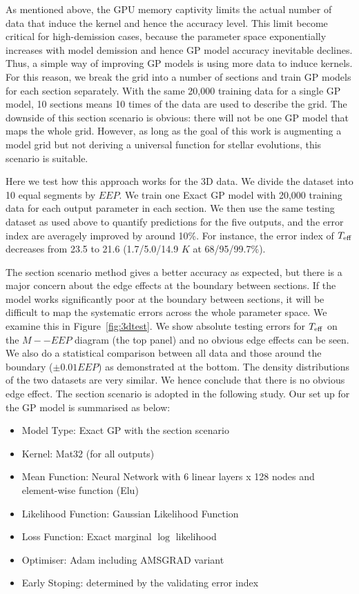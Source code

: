 As mentioned above, the GPU memory captivity limits the actual number of data that induce the kernel and hence the accuracy level.  
This limit become critical for high-demission cases, because the parameter space exponentially increases with model demission and hence GP model accuracy inevitable declines. Thus, a simple way of improving GP models is using more data to induce kernels. 
%
For this reason, we break the grid into a number of sections and train GP models for each section separately. With the same 20,000 training data for a single GP model, 10 sections means 10 times of the data are used to describe the grid. 
%
The downside of this section scenario is obvious: there will not be one GP model that maps the whole grid. However, as long as the goal of this work is augmenting a model grid but not deriving a universal function for stellar evolutions, this scenario is suitable. 

Here we test how this approach works for the 3D data. We divide the dataset into 10 equal segments by $EEP$. We train one Exact GP model with 20,000 training data for each output parameter in each section. We then use the same testing dataset as used above to quantify predictions for the five outputs, and the error index are averagely improved by around 10\%. For instance, the error index of $T_{\rm eff}$ decreases from 23.5 to 21.6 (1.7/5.0/14.9 $K$ at 68/95/99.7\%). 
%

The section scenario method gives a better accuracy as expected, but there is a major concern about the edge effects at the boundary between sections. If the model works significantly poor at the boundary between sections, it will be difficult to map the systematic errors across the whole parameter space. We examine this in Figure~\ref{fig:3dtest}. We show absolute testing errors for $T_{\rm eff}$ on the $M -- EEP$ diagram (the top panel) and no obvious edge effects can be seen. We also do a statistical comparison between all data and those around the boundary ($\pm0.01EEP$) as demonstrated at the bottom. The density distributions of the two datasets are very similar. We hence conclude that there is no obvious edge effect.
%
The section scenario is adopted in the following study.  Our set up for the GP model is summarised as below:
\begin{itemize}
\item Model Type: Exact GP with the section scenario
\item Kernel: Mat32 (for all outputs)
\item Mean Function: Neural Network with 6 linear layers x 128 nodes and element-wise function (Elu) 
\item Likelihood Function: Gaussian Likelihood Function
\item Loss Function: Exact marginal $\log$ likelihood
\item Optimiser: Adam including AMSGRAD variant
\item Early Stoping: determined by the validating error index
\end{itemize}







     





